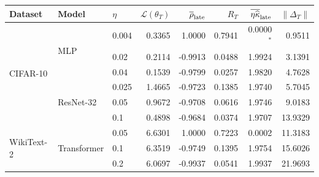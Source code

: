 \begin{tabular}{@{}lllrrrrr@{}}
\toprule
Dataset & Model & $\eta$ & $\mathcal L(\theta_T)$ & $\overline\rho_{\rm late}$ & $R_T$ & $\overline{\eta\widehat\kappa}_{\rm late}$ & $\|\Delta_T\|$ \\
\midrule
\multirow{6}{*}{CIFAR-10} & \multirow{3}{*}{MLP} & 0.004 & 0.3365 & 1.0000 & 0.7941 & 0.0000$^{*}$ & 0.9511 \\
 &  & 0.02 & 0.2114 & -0.9913 & 0.0488 & 1.9924 & 3.1391 \\
 &  & 0.04 & 0.1539 & -0.9799 & 0.0257 & 1.9820 & 4.7628 \\
\cmidrule(l){2-8}
 & \multirow{3}{*}{ResNet-32} & 0.025 & 1.4665 & -0.9723 & 0.1385 & 1.9740 & 5.7045 \\
 &  & 0.05 & 0.9672 & -0.9708 & 0.0616 & 1.9746 & 9.0183 \\
 &  & 0.1 & 0.4898 & -0.9684 & 0.0374 & 1.9707 & 13.9329 \\
\midrule
\multirow{3}{*}{WikiText-2} & \multirow{3}{*}{Transformer} & 0.05 & 6.6301 & 1.0000 & 0.7223 & 0.0002 & 11.3183 \\
 &  & 0.1 & 6.3519 & -0.9749 & 0.1395 & 1.9754 & 15.6026 \\
 &  & 0.2 & 6.0697 & -0.9937 & 0.0541 & 1.9937 & 21.9693 \\
\bottomrule
\end{tabular}
